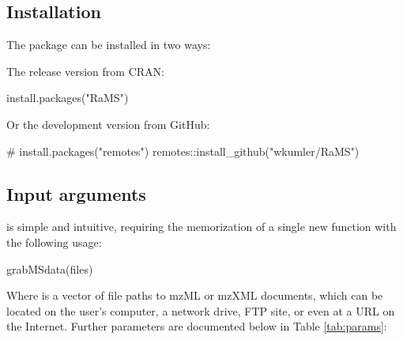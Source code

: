 \subsection{Installation}

The  package can be installed in two ways:

The release version from CRAN:

\begin{example}
    install.packages("RaMS")
\end{example}

Or the development version from GitHub:

\begin{example}
    # install.packages("remotes")
    remotes::install_github("wkumler/RaMS")
\end{example}

\subsection{Input arguments}

 is simple and intuitive, requiring the memorization of a single new function  with the following usage:

\begin{example}
    grabMSdata(files)
\end{example}

Where  is a vector of file paths to mzML or mzXML documents, which can be located on the user's computer, a network drive, FTP site, or even at a URL on the Internet. 
Further parameters are documented below in Table \ref{tab:params}:

